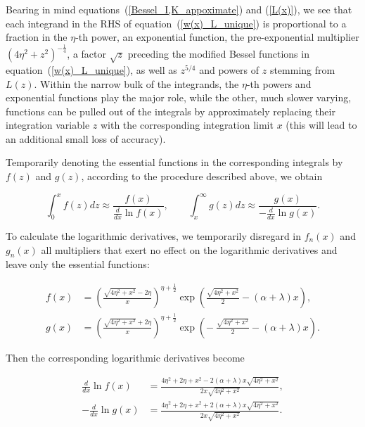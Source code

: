 \documentclass[draft]{agujournal2019}
\begin{document}
{Bearing in mind equations~(\ref{Bessel_I,K_appoximate}) and (\ref{L(x)}), we
see that each integrand in the RHS of equation~(\ref{w(x)_L_unique}) is
proportional to a fraction in the $\eta$-th power, an exponential function,
the pre-exponential multiplier $(4\eta^{2}+z^{2})^{-\frac{1}{4}}$, a factor $\sqrt{z}$ preceding the
modified Bessel functions in equation~(\ref{w(x)_L_unique}), as well as
$z^{5/4}$ and powers of $z$ stemming from $L(z)$. Within the narrow bulk of
the integrands, the $\eta$-th powers and exponential functions play the
major role, while the other, much slower varying, functions can be pulled out
of the integrals by approximately replacing their integration variable $z$
with the corresponding integration limit $x$ (this will lead to an additional small
loss of accuracy).

Temporarily denoting the essential functions in the corresponding integrals by
$f(z)$ and $g(z)$, according to the procedure
described above, we obtain
\begin{linenomath*}
\begin{equation}
\int_{0}^{x}f\left(  z\right)  dz\approx\frac{f\left(  x\right)  }{\frac
{d}{dx}\ln f\left(  x\right)  },\qquad\int_{x}^{\infty}g\left(  z\right)
dz\approx\frac{g\left(  x\right)  }{-\frac{d}{dx}\ln g\left(  x\right)  }.
\label{f,g}
\end{equation}
\end{linenomath*}
To calculate the logarithmic derivatives, we temporarily disregard in
$f_{n}(x)  $ and $g_{n}(x)  $ all multipliers that
exert no effect on the logarithmic derivatives and leave only the essential
functions:
\begin{linenomath*}
\begin{subequations}
\label{f,g_kappa}
\begin{align}
f\left(  x\right)   &  =\left(  \frac{\sqrt{4\eta^{2}+x^{2}}-2\eta}{x}\right)
^{\eta+\frac{1}{2}}\exp\left(  \frac{\sqrt{4\eta^{2}+x^{2}}}{2}-\left(
\alpha+\lambda\right)  x\right)  ,\label{f_kappa}\\
g\left(  x\right)   &  =\left(  \frac{\sqrt{4\eta^{2}+x^{2}}+2\eta}{x}\right)
^{\eta+\frac{1}{2}}\exp\left(  -\ \frac{\sqrt{4\eta^{2}+x^{2}}}{2}-\left(
\alpha+\lambda\right)  x\right)  . \label{g_kappa}%
\end{align}
\end{subequations}
\end{linenomath*}
Then the corresponding logarithmic derivatives become
\begin{linenomath*}
\begin{subequations}
\label{(d/dx)f,g_kappa}
\begin{align}
\frac{d}{dx}\ln f\left(  x\right)   &  =\frac{4\eta^{2}+2\eta+x^{2}-2\left(
\alpha+\lambda\right)  x\sqrt{4\eta^{2}+x^{2}}}{2x\sqrt{4\eta^{2}+x^{2}}%
},\label{(d/dx)f_kappa}\\
-\frac{d}{dx}\ln g\left(  x\right)   &  =\frac{4\eta^{2}+2\eta+x^{2}+2\left(
\alpha+\lambda\right)  x\sqrt{4\eta^{2}+x^{2}}}{2x\sqrt{4\eta^{2}+x^{2}}}.
\label{(d/dx)g_kappa}
\end{align}
\end{subequations}
\end{linenomath*}

}
\end{document}
